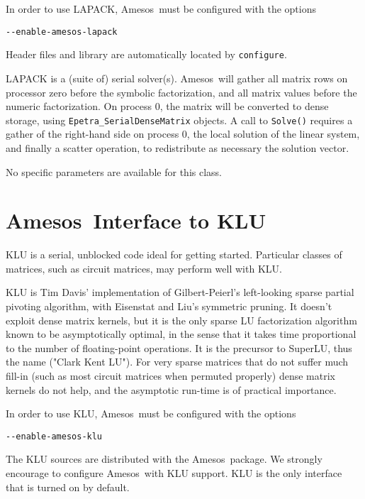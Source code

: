 \documentclass[11pt]{SANDreport}
\newcommand{\amesos}{{\sc Amesos}}
\begin{document}
\smallskip

In order to use LAPACK, \amesos\ must be configured with the options
\begin{verbatim}
--enable-amesos-lapack 
\end{verbatim}
Header files and library are automatically located by {\tt configure}.

\smallskip

LAPACK is a (suite of) serial solver(s). \amesos\ will gather all matrix rows on processor
zero before the symbolic factorization, and all matrix values before the
numeric factorization. On process 0, the matrix will be converted
to dense storage, using \verb!Epetra_SerialDenseMatrix! objects.
A call to \verb!Solve()! requires a gather
of the right-hand side on process 0, the local solution of the linear
system, and finally a scatter operation, to redistribute as necessary the
solution vector.

\smallskip

No specific parameters are available for this class.

\section{\amesos\ Interface to KLU}
\label{sec:klu}

KLU is a serial, unblocked code ideal for getting started. Particular
classes of matrices, such as circuit matrices, may perform well with KLU.

KLU is Tim Davis' implementation of Gilbert-Peierl's left-looking sparse
partial pivoting algorithm, with Eisenstat and Liu's symmetric pruning.
It doesn't exploit dense matrix kernels, but it is the only sparse LU
factorization algorithm known to be asymptotically optimal, in the sense
that it takes time proportional to the number of floating-point
operations. It is the precursor to SuperLU, thus the name ("Clark Kent
LU"). For very sparse matrices that do not suffer much fill-in (such as
most circuit matrices when permuted properly) dense matrix kernels do
not help, and the asymptotic run-time is of practical importance.

\smallskip

In order to use KLU, \amesos\ must be configured with the options
\begin{verbatim}
--enable-amesos-klu
\end{verbatim}
The KLU sources are distributed with the \amesos\ package. We strongly encourage
to configure \amesos\ with KLU support. KLU is the only interface that is
turned on by default.
\end{document}
